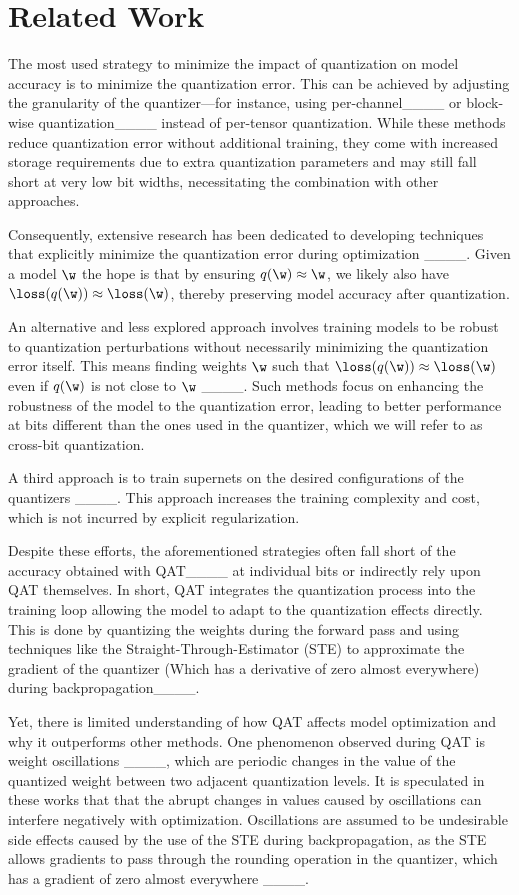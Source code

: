 \section{Related Work}
The most used strategy to minimize the impact of quantization on model accuracy is to minimize the quantization error. This can be achieved by adjusting the granularity of the quantizer—for instance, using per-channel____ or block-wise quantization____ instead of per-tensor quantization. While these methods reduce quantization error without additional training, they come with increased storage requirements due to extra quantization parameters and may still fall short at very low bit widths, necessitating the combination with other approaches.

Consequently, extensive research has been dedicated to developing techniques that explicitly minimize the quantization error during optimization ____. Given a model $\w$ the hope is that by ensuring \( q(\w) \approx \w \), we likely also have \( \loss(q(\w)) \approx \loss(\w) \), thereby preserving model accuracy after quantization.

 
An alternative and less explored approach involves training models to be robust to quantization perturbations without necessarily minimizing the quantization error itself. This means finding weights \( \w \) such that \( \loss(q(\w)) \approx \loss(\w) \) even if \( q(\w) \) is not close to \( \w \) ____. Such methods focus on enhancing the robustness of the model to the quantization error, leading to better performance at bits different than the ones used in the quantizer, which we will refer to as cross-bit quantization.

A third approach is to train supernets on the desired configurations of the quantizers ____. This approach increases the training complexity and cost, which is not incurred by explicit regularization. 

Despite these efforts, the aforementioned strategies often fall short of the accuracy obtained with QAT____ at individual bits or indirectly rely upon QAT themselves. In short, QAT integrates the quantization process into the training loop allowing the model to adapt to the quantization effects directly. This is done by quantizing the weights during the forward pass and using techniques like the Straight-Through-Estimator (STE) to approximate the gradient of the quantizer (Which has a derivative of zero almost everywhere) during backpropagation____.

Yet, there is limited understanding of how QAT affects model optimization and why it outperforms other methods. One phenomenon observed during QAT is weight oscillations ____, which are periodic changes in the value of the quantized weight between two adjacent quantization levels. It is speculated in these works that that the abrupt changes in values caused by oscillations can interfere negatively with optimization. Oscillations are assumed to be undesirable side effects caused by the use of the STE during backpropagation, as the STE allows gradients to pass through the rounding operation in the quantizer, which has a gradient of zero almost everywhere ____.

